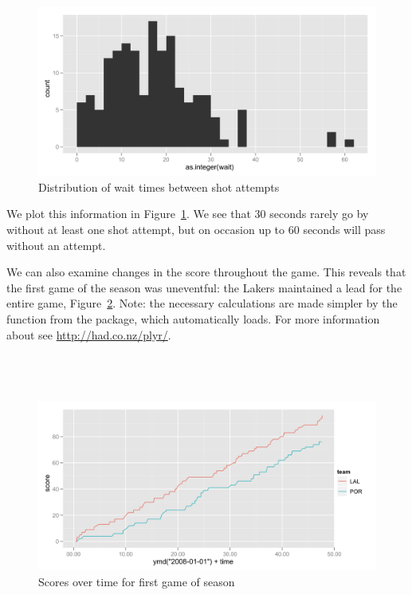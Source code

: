 \documentclass[article]{jss}
\begin{document}
\\
\\

\begin{figure}[htpb]
  \centering
  \includegraphics[width=\textwidth]{wait-histogram.png}        
  \caption{Distribution of wait times between shot attempts}
  \label{fig:waits}
\end{figure}

We plot this information in Figure~\ref{fig:waits}. We see that 30 seconds rarely go by without at least one shot attempt, but on occasion up to 60 seconds will pass without an attempt.

We can also examine changes in the score throughout the game. This reveals that the first game of the season was uneventful: the Lakers maintained a lead for the entire game, Figure~\ref{fig:scores}. Note: the necessary calculations are made simpler by the  function from the  package, which  automatically loads.  For more information about  see \url{http://had.co.nz/plyr/}.\\

\\
\\
\\

\begin{figure}[htpb]
  \centering
  \includegraphics[width=\textwidth]{score-comparison.png}        
  \caption{Scores over time for first game of season}
  \label{fig:scores}
\end{figure}
\end{document}
